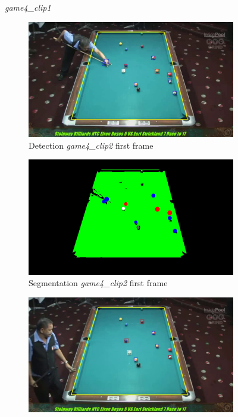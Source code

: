 \begin{figure}[H]
	\caption{\textit{game4\_clip1}}
\end{figure}


\begin{figure}[H]
	\centering
	\begin{subfigure}[b]{0.48\textwidth}
		\centering
		\includegraphics[width=\textwidth]{images/Detection/game4_clip2_detected_balls_first_frame.jpg}
		\caption{Detection \textit{game4\_clip2} first frame}
		\label{fig: game4_clip2_first_frame_detected}
	\end{subfigure}
	\begin{subfigure}[b]{0.48\textwidth}
		\centering
		\includegraphics[width=\textwidth]{images/Segmentation/game4_clip2_segmented_balls_first_frame.jpg}
		\caption{Segmentation \textit{game4\_clip2} first frame}
		\label{fig: game4_clip2_first_frame_segmented}
	\end{subfigure}
	\begin{subfigure}[b]{0.48\textwidth}
		\centering
		\includegraphics[width=\textwidth]{images/Detection/game4_clip2_detected_balls_last_frame.jpg}

\end{subfigure}
\end{figure}
